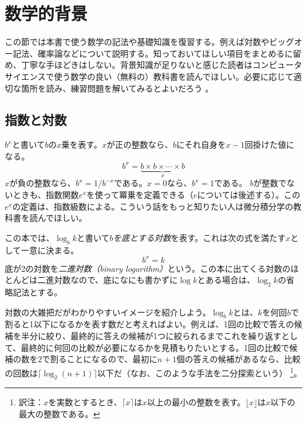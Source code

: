 \section{数学的背景}
この節では本書で使う数学の記法や基礎知識を復習する。例えば対数やビッグオー記法、確率論などについて説明する。知っておいてほしい項目をまとめるに留め、丁寧な手ほどきはしない。背景知識が足りないと感じた読者はコンピュータサイエンスで使う数学の良い（無料の）教科書を読んでほしい。必要に応じて適切な箇所を読み、練習問題を解いてみるとよいだろう
\cite{llm11}。

\subsection{指数と対数}

$b^x$と書いて$b$の$x$乗を表す。$x$が正の整数なら、$b$にそれ自身を$x-1$回掛けた値になる。
\[
    b^x = \underbrace{b\times b\times \cdots \times b}_{x}
\]
$x$が負の整数なら、$b^x=1/b^{-x}$である。$x=0$なら、$b^x=1$である。
$b$が整数でないときも、指数関数$e^x$を使って冪乗を定義できる（$e$については後述する）。この$e^x$の定義は、指数級数による。こういう話をもっと知りたい人は微分積分学の教科書を読んでほしい。

この本では、$\log_b k$と書いて\emph{$b$を底とする対数}を表す。これは次の式を満たす$x$として一意に決まる。
\[
    b^{x} = k
\]
底が2の対数を\emph{二進対数（binary logarithm）}という。この本に出てくる対数のほとんどは二進対数なので、底になにも書かずに$\log k$とある場合は、$\log_2 k$の省略記法とする。
%
%

対数の大雑把だがわかりやすいイメージを紹介しよう。$\log_b k$とは、$k$を何回$b$で割ると1以下になるかを表す数だと考えればよい。例えば、1回の比較で答えの候補を半分に絞り、最終的に答えの候補が1つに絞られるまでこれを繰り返すとして、最終的に何回の比較が必要になるかを見積もりたいとする。1回の比較で候補の数を$2$で割ることになるので、最初に$n+1$個の答えの候補があるなら、比較の回数は$\lceil \log_2(n+1) \rceil$以下だ（なお、このような手法を二分探索という）%
\footnote{訳注：$x$を実数とするとき、$\lceil x \rceil$は$x$以上の最小の整数を表す。$\lfloor x \rfloor$は$x$以下の最大の整数である。}。

